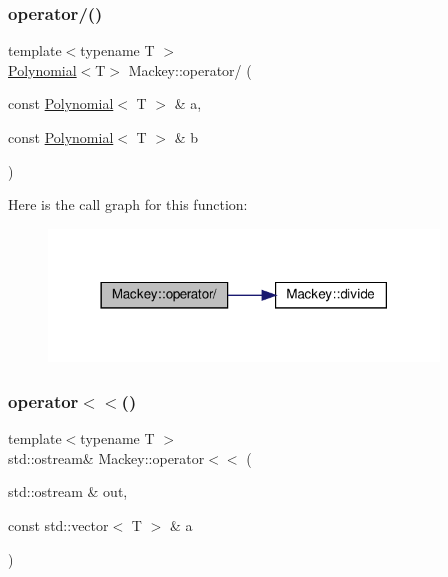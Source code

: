 \mbox{\label{namespaceMackey_ac26fb6e8a8b7350d13f866570d588e6c}} 
\subsubsection{\texorpdfstring{operator/()}{operator/()}}
{\footnotesize\ttfamily template$<$typename T $>$ \\
\hyperlink{classMackey_1_1Polynomial}{Polynomial}$<$T$>$ Mackey\+::operator/ (\begin{DoxyParamCaption}\item[{const \hyperlink{classMackey_1_1Polynomial}{Polynomial}$<$ T $>$ \&}]{a,  }\item[{const \hyperlink{classMackey_1_1Polynomial}{Polynomial}$<$ T $>$ \&}]{b }\end{DoxyParamCaption})}

Here is the call graph for this function\+:\nopagebreak
\begin{figure}[H]
\begin{center}
\leavevmode
\includegraphics[width=294pt]{namespaceMackey_ac26fb6e8a8b7350d13f866570d588e6c_cgraph}
\end{center}
\end{figure}
\mbox{\label{namespaceMackey_aa4da3e3b46b9cb20f3be57d7e5da2d5d}} 
\subsubsection{\texorpdfstring{operator$<$$<$()}{operator<<()}\hspace{0.1cm}{\footnotesize\ttfamily [1/2]}}
{\footnotesize\ttfamily template$<$typename T $>$ \\
std\+::ostream\& Mackey\+::operator$<$$<$ (\begin{DoxyParamCaption}\item[{std\+::ostream \&}]{out,  }\item[{const std\+::vector$<$ T $>$ \&}]{a }\end{DoxyParamCaption})}



